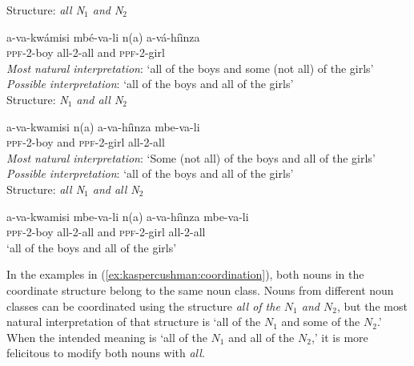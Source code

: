 \documentclass[output=paper,modfonts,nonflat]{langsci/langscibook}
\begin{document}
\begin{exe} 

\ex \begin{xlist} \label{ex:kaspercushman:coordination}

\ex Structure: \emph{all N$_{1}$ and N$_{2}$} 


\gll a-va-kwámisi mbé-va-li n(a)	a-vá-hí\`inza \label{ex:kaspercushman:allboysgirls}\\  
\textsc{ppf}-2-boy all-2-all and \textsc{ppf}-2-girl \\
\vspace{-1.25mm}
\textit{Most natural interpretation}: `all of the boys and some (not all) of the girls' \\
\textit{Possible interpretation}: `all of the boys and all of the girls' \\




\ex  Structure: \emph{N$_{1}$ and all N$_{2}$} 


\gll a-va-kwamisi n(a) a-va-hí\`inza mbe-va-li \label{ex:kaspercushman:allgirls}  \\  
\textsc{ppf}-2-boy and \textsc{ppf}-2-girl all-2-all\\

\textit{Most natural interpretation}: `Some (not all) of the boys and all of the girls' \\
\textit{Possible interpretation}: `all of the boys and all of the girls' \\




\ex  Structure: \emph{all N$_{1}$ and all N$_{2}$} 

\gll a-va-kwamisi mbe-va-li n(a) a-va-hí\`inza mbe-va-li  \label{ex:kaspercushman:allboysallgirls} \\  
\textsc{ppf}-2-boy all-2-all  and \textsc{ppf}-2-girl all-2-all\\
\glt `all of the boys and all of the girls' \\

\end{xlist}
\end{exe} 

In the examples in (\ref{ex:kaspercushman:coordination}), both nouns in the coordinate structure belong to the same noun class. Nouns from different noun classes can be coordinated using the structure \textit{all of the $N_{1}$ and $N_{2}$}, but the most natural interpretation of that structure is `all of the $N_{1}$ and some of the $N_{2}$.'  When the intended meaning is `all of the $N_{1}$ and all of the $N_{2}$,' it is more felicitous to modify both nouns with \textit{all}.  
\end{document}
